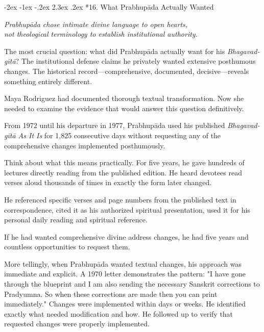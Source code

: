 \documentclass[12pt,twoside]{book}
\makeatletter
\renewcommand\section{\@startsection{section}{1}{\z@}%
{-3.5ex \@plus -1ex \@minus -.2ex}%
{2.3ex \@plus.2ex}%
{\normalfont\Large\bfseries}}
\let\oldsection\section
\renewcommand{\section}[1]{\needspace{4\baselineskip}\oldsection{#1}}
\renewcommand\section{\@startsection{section}{1}{\z@}%
{-2ex \@plus -1ex \@minus -.2ex}%
{2.3ex \@plus.2ex}%
{\normalfont\Large\bfseries}}
\makeatother
\begin{document}
\section*{16. What Prabhupāda Actually Wanted}
\thispagestyle{chapterpage}

{\centering\itshape Prabhupāda chose intimate divine language to open hearts,\\not theological terminology to establish institutional authority.\par}
\vspace{0.1cm}

\normalfont\justifying
The most crucial question: what did Prabhupāda actually want for his \emph{Bhagavad-gītā}? The institutional defense claims he privately wanted extensive posthumous changes. The historical record—comprehensive, documented, decisive—reveals something entirely different.

Maya Rodriguez had documented thorough textual transformation. Now she needed to examine the evidence that would answer this question definitively.


From 1972 until his departure in 1977, Prabhupāda used his published \emph{Bhagavad-gītā As It Is} for 1,825 consecutive days without requesting any of the comprehensive changes implemented posthumously.

Think about what this means practically. For five years, he gave hundreds of lectures directly reading from the published edition. He heard devotees read verses aloud thousands of times in exactly the form later changed.

He referenced specific verses and page numbers from the published text in correspondence, cited it as his authorized spiritual presentation, used it for his personal daily reading and spiritual reference.

If he had wanted comprehensive divine address changes, he had five years and countless opportunities to request them.

More tellingly, when Prabhupāda wanted textual changes, his approach was immediate and explicit. A 1970 letter demonstrates the pattern: "I have gone through the blueprint and I am also sending the necessary Sanskrit corrections to Pradyumna. So when these corrections are made then you can print immediately." Changes were implemented within days or weeks. He identified exactly what needed modification and how. He followed up to verify that requested changes were properly implemented.
\end{document}
